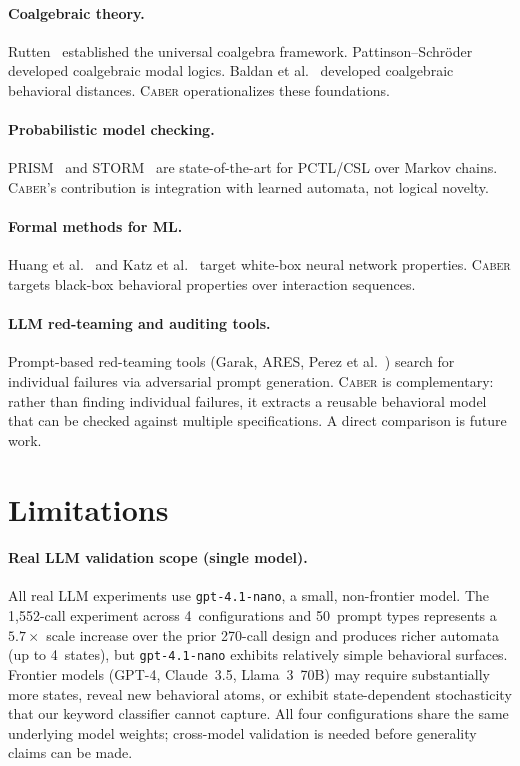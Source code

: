\documentclass[11pt]{article}
\newcommand{\tool}{\textsc{Caber}}
\begin{document}
\paragraph{Coalgebraic theory.}
Rutten~\cite{rutten2000universal} established the universal coalgebra
framework.  Pattinson--Schr\"oder~\cite{pattinson2008coalgebraic}
developed coalgebraic modal logics.
Baldan et al.~\cite{baldan2018coalgebraic} developed coalgebraic
behavioral distances.  \tool{} operationalizes these foundations.

\paragraph{Probabilistic model checking.}
PRISM~\cite{kwiatkowska2011prism} and STORM~\cite{hensel2022storm} are
state-of-the-art for PCTL/CSL over Markov chains.  \tool{}'s
contribution is integration with learned automata, not logical novelty.

\paragraph{Formal methods for ML.}
Huang et al.~\cite{huang2017safety} and Katz et
al.~\cite{katz2017reluplex} target white-box neural network properties.
\tool{} targets black-box behavioral properties over interaction sequences.

\paragraph{LLM red-teaming and auditing tools.}
Prompt-based red-teaming tools (Garak, ARES, Perez et
al.~\cite{perez2022red}) search for individual failures via
adversarial prompt generation.  \tool{} is complementary: rather than
finding individual failures, it extracts a reusable behavioral model
that can be checked against multiple specifications.  A direct
comparison is future work.

\section{Limitations}\label{sec:limitations}

\paragraph{Real LLM validation scope (single model).}
All real LLM experiments use \texttt{gpt-4.1-nano}, a small,
non-frontier model.  The 1{,}552-call experiment across 4~configurations
and 50~prompt types represents a $5.7{\times}$ scale increase over the
prior 270-call design and produces richer automata (up to 4~states),
but \texttt{gpt-4.1-nano} exhibits relatively simple behavioral
surfaces.  Frontier models (GPT-4, Claude~3.5, Llama~3~70B) may
require substantially more states, reveal new behavioral atoms, or
exhibit state-dependent stochasticity that our keyword classifier
cannot capture.  All four configurations share the same underlying
model weights; cross-model validation is needed before generality
claims can be made.
\end{document}
